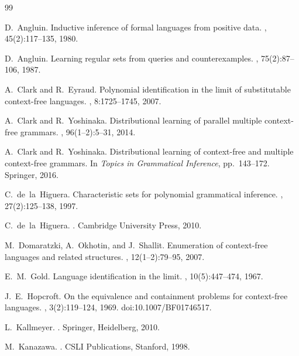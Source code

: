 \documentclass[11pt,a4paper]{article}
\theoremstyle{remark}
\begin{document}
\begin{thebibliography}{99}

D.~Angluin.
\newblock Inductive inference of formal languages from positive data.
, 45(2):117--135, 1980.

D.~Angluin.
\newblock Learning regular sets from queries and counterexamples.
, 75(2):87--106, 1987.

A.~Clark and R.~Eyraud.
\newblock Polynomial identification in the limit of substitutable context-free
languages.
, 8:1725--1745, 2007.

A.~Clark and R.~Yoshinaka.
\newblock Distributional learning of parallel multiple context-free grammars.
, 96(1--2):5--31, 2014.

A.~Clark and R.~Yoshinaka.
\newblock Distributional learning of context-free and multiple context-free
grammars.
\newblock In {\em Topics in Grammatical Inference}, pp.~143--172. Springer,
2016.

C.~de~la~Higuera.
\newblock Characteristic sets for polynomial grammatical inference.
, 27(2):125--138, 1997.

C.~de~la~Higuera.
.
\newblock Cambridge University Press, 2010.

M.~Domaratzki, A.~Okhotin, and J.~Shallit.
\newblock Enumeration of context-free languages and related structures.
,
12(1--2):79--95, 2007.

E.~M.~Gold.
\newblock Language identification in the limit.
, 10(5):447--474, 1967.

J.~E.~Hopcroft.
\newblock On the equivalence and containment problems for context-free
languages.
, 3(2):119--124, 1969.
\newblock doi:10.1007/BF01746517.

L.~Kallmeyer.
.
\newblock Springer, Heidelberg, 2010.

M.~Kanazawa.
.
\newblock CSLI Publications, Stanford, 1998.


\end{thebibliography}
\end{document}
